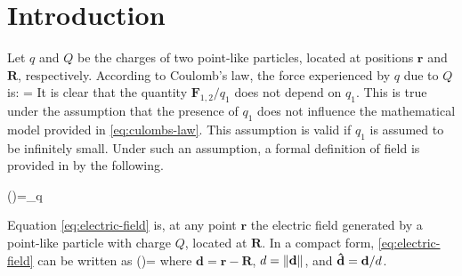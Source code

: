 \section{Introduction}
Let $q$ and $Q$ be the charges of two point-like particles, located at positions $\mathbf{r}$ and $\mathbf{R}$, respectively.
According to Coulomb's law, the force experienced by $q$ due to $Q$ is:
\be\label{eq:culombs-law}
=
\ee
It is clear that the quantity $\mathbf{F}_{1,2}/q_{1}$ does not depend on $q_{1}$. This is true under the assumption that the presence of $q_{1}$ does not influence the mathematical model provided in \ref{eq:culombs-law}. This assumption is valid if $q_{1}$ is assumed to be infinitely small. Under such an assumption, a formal definition of field is provided in by the following.

\be\label{eq:electric-field}
()=\lim_{q } 
\ee

Equation \ref{eq:electric-field} is, at any point $\mathbf{r}$ the electric field generated by a point-like particle with charge $Q$, located at $\mathbf{R}$.
In a compact form, \ref{eq:electric-field} can be written as 
\be\label{eq:compact-electric-field}
()=
\ee
where $\mathbf{d}=\mathbf{\mathbf{r}-\mathbf{R}}$, $d=\left\lVert\mathbf{d}\right\rVert$, and $\boldsymbol{\hat{\textbf{$\mathrm d$}}}=\mathbf{d}/d$.